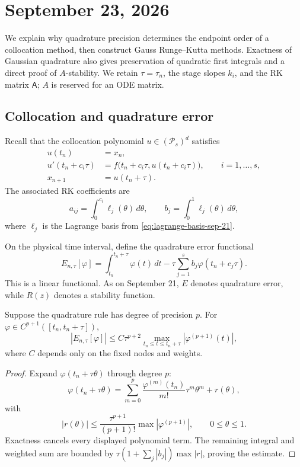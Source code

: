 \section{September 23, 2026}

We explain why quadrature precision determines the endpoint order of
a collocation method, then construct Gauss Runge--Kutta methods.
Exactness of Gaussian quadrature also gives preservation of quadratic
first integrals and a direct proof of \(A\)-stability.
We retain \(\tau=\tau_n\), the stage slopes \(k_i\), and the RK matrix
\(\mathsf A\); \(A\) is reserved for an ODE matrix.

\subsection{Collocation and quadrature error}

Recall that the collocation polynomial \(u\in(\mathcal P_s)^d\)
satisfies
\begin{align*}
 u(t_n)&=x_n,\\
 u'(t_n+c_i\tau)&=f\bigl(t_n+c_i\tau,u(t_n+c_i\tau)\bigr),
       \qquad i=1,\ldots,s,\\
 x_{n+1}&=u(t_n+\tau).
\end{align*}
The associated RK coefficients are
\[
 a_{ij}=\int_0^{c_i}\ell_j(\theta)\,d\theta,
 \qquad b_j=\int_0^1\ell_j(\theta)\,d\theta,
\]
where \(\ell_j\) is the Lagrange basis from
\eqref{eq:lagrange-basis-sep-21}.

On the physical time interval, define the quadrature error functional
\begin{equation}\label{eq:physical-quadrature-error-sep-23}
 E_{n,\tau}[\varphi]
  =\int_{t_n}^{t_n+\tau}\varphi(t)\,dt
       -\tau\sum_{j=1}^s b_j\varphi(t_n+c_j\tau).
\end{equation}
This is a linear functional. As on September 21, \(E\) denotes
quadrature error, while \(R(z)\) denotes a stability function.

\begin{lemma}
 Suppose the quadrature rule has degree of precision \(p\). For
 \(\varphi\in C^{p+1}([t_n,t_n+\tau])\),
 \[
  |E_{n,\tau}[\varphi]|
   \leq C\tau^{p+2}
      \max_{t_n\leq t\leq t_n+\tau}|\varphi^{(p+1)}(t)|,
 \]
 where \(C\) depends only on the fixed nodes and weights.
\end{lemma}

\begin{proof}
 Expand \(\varphi(t_n+\tau\theta)\) through degree \(p\):
 \[
  \varphi(t_n+\tau\theta)
   =\sum_{m=0}^p\frac{\varphi^{(m)}(t_n)}{m!}
                     \tau^m\theta^m+r(\theta),
 \]
 with
 \[
  |r(\theta)|\leq
   \frac{\tau^{p+1}}{(p+1)!}
   \max|\varphi^{(p+1)}|,
   \qquad 0\leq\theta\leq1.
 \]
 Exactness cancels every displayed polynomial term. The remaining
 integral and weighted sum are bounded by
 \(\tau(1+\sum_j|b_j|)\max|r|\), proving the estimate.
\end{proof}

